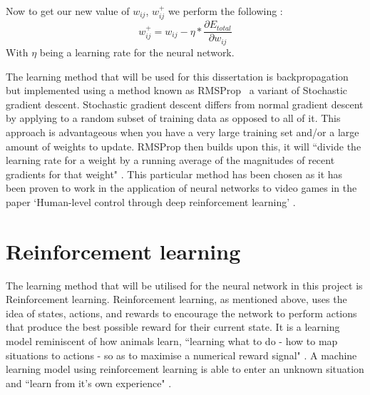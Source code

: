 \documentclass[10pt]{article}
\begin{document}
		Now to get our new value of $w_{ij}$, $w^+_{ij}$ we perform the following \cite{bpexample}:
		\begin{equation}
			w^+_{ij} = w_{ij} - \eta * \frac{\partial E_{total}}{\partial w_{ij}}
		\end{equation}
		With $\eta$ being a learning rate for the neural network.\\
		
		\medskip

		The learning method that will be used for this dissertation is backpropagation but implemented using a method known as RMSProp \cite{rms}\ a variant of Stochastic gradient descent. Stochastic gradient descent differs from normal gradient descent by applying to a random subset of training data as opposed to all of it. This approach is advantageous when you have a very large training set and/or a large amount of weights to update. RMSProp then builds upon this, it will ``divide the learning rate for a weight by a running average of the magnitudes of recent gradients for that weight" \cite{rms}. This particular method has been chosen as it has been proven to work in the application of neural networks to video games in the paper `Human-level control through deep reinforcement learning' \cite{humanlevel}.\\
	
	\bigskip
	\section{Reinforcement learning}
		The learning method that will be utilised for the neural network in this project is Reinforcement learning. Reinforcement learning, as mentioned above, uses the idea of states, actions, and rewards to encourage the network to perform actions that produce the best possible reward for their current state. It is a learning model reminiscent of how animals learn, ``learning what to do - how to map situations to actions - so as to maximise a numerical reward signal" \cite{rlintro}. A machine learning model using reinforcement learning is able to enter an unknown situation and ``learn from it's own experience" \cite{rlintro}.\\
		
		\medskip
		
\end{document}
